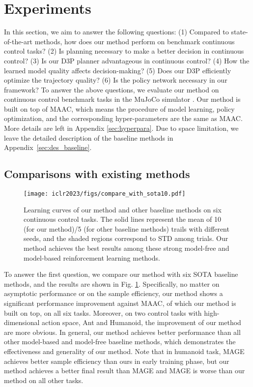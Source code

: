 \documentclass{article}
\newcommand{\yue}[1]{ {#1}}
\newcommand{\revision}[1]{{#1}}
\begin{document}
\section{Experiments}

In this section, we aim to answer the following questions: (1) Compared to state-of-the-art methods, how does our method perform on benchmark continuous control tasks? (2) Is planning necessary to make a better decision in continuous control? (3) Is our D3P planner advantageous in continuous control?  (4) How the learned model quality affects decision-making? (5) Does our D3P efficiently optimize the trajectory quality? (6) Is  the policy network necessary in our framework?
To answer the above questions, we evaluate our method on continuous control benchmark tasks in the MuJoCo simulator { }. 
\yue{Our method is built on top of MAAC, which means the procedure of model learning, policy optimization, and the corresponding hyper-parameters are the same as MAAC. More details are left in Appendix \ref{sec:hyperpara}.} Due to space limitation, we leave the detailed description of the baseline methods in Appendix~\ref{sec:des_baseline}.

 
\subsection{Comparisons with existing methods}\label{sec:experiment_result}

\vspace{-0.5cm}
\begin{figure}[!htb]
    \centering
    \texttt{[image: iclr2023/figs/compare\_with\_sota10.pdf]}
   
    \caption{ {  Learning curves of our method and other baseline methods on six continuous control tasks. The solid lines represent the mean of \revision{10 (for our method)/5 (for other baseline methods)} trails with different seeds, and the shaded regions correspond to STD among  trials. Our method achieves the best results among these strong model-free and model-based reinforcement learning methods.}}
    \label{fig:comparison_sota}
\end{figure}

To answer the first question, we compare our method with six SOTA baseline methods, and the results are shown in Fig. \ref{fig:comparison_sota}. Specifically, no matter on asymptotic performance or on the sample efficiency, our method shows a significant performance improvement against MAAC, of which our method is built on top, on all six tasks. Moreover, on two control tasks with high-dimensional action space, Ant and Humanoid, the improvement of our method are more obvious.  In general, our method achieves better performance than all other model-based and model-free baseline methods, which demonstrates the effectiveness and generality of our method. Note that in humanoid task, MAGE  achieves better sample efficiency than ours in early training phase, but our method achieves a better final result than MAGE and MAGE is worse than our method on all other tasks.
\end{document}
